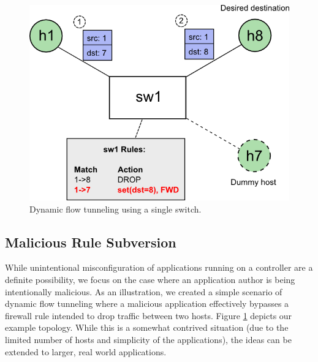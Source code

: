 \begin{figure}[ht!]
	\begin{center}
		\includegraphics[width=\columnwidth]{figs/singleSwitch_diagram.png}
		\caption{Dynamic flow tunneling using a single switch.}
		\label{fig:dft_single}
	\end{center}
\end{figure}

\subsection{Malicious Rule Subversion}
While unintentional misconfiguration of applications running on a controller are a definite possibility, we focus on the case where an application author is being intentionally malicious.
As an illustration, we created a simple scenario of dynamic flow tunneling where a malicious application effectively bypasses a firewall rule intended to drop traffic between two hosts.
Figure \ref{fig:dft_single} depicts our example topology.
While this is a somewhat contrived situation (due to the limited number of hosts and simplicity of the applications), the ideas can be extended to larger, real world applications.

